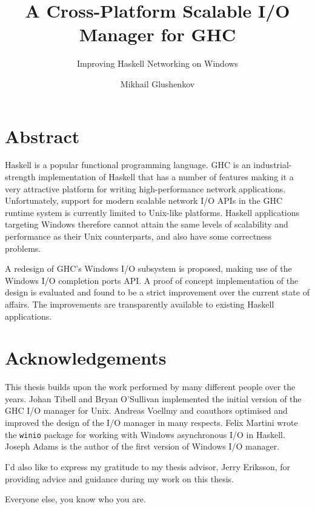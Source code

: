 \documentclass[a4paper,11pt,oneside]{report}
\title{A Cross-Platform Scalable I/O Manager for GHC}
\subtitle{Improving Haskell Networking on Windows}
\author{Mikhail Glushenkov}
\begin{document}
\maketitle

\chapter*{Abstract}

Haskell is a popular functional programming language. GHC is an
industrial-strength implementation of Haskell that has a number of features
making it a very attractive platform for writing high-performance network
applications. Unfortunately, support for modern scalable network I/O APIs in the
GHC runtime system is currently limited to Unix-like platforms. Haskell
applications targeting Windows therefore cannot attain the same levels of
scalability and performance as their Unix counterparts, and also have some
correctness problems.

A redesign of GHC's Windows I/O subsystem is proposed, making use of the Windows
I/O completion ports API. A proof of concept implementation of the design is
evaluated and found to be a strict improvement over the current state of
affairs. The improvements are transparently available to existing Haskell
applications.

\pagebreak

\chapter*{Acknowledgements}

This thesis builds upon the work performed by many different people over the
years. Johan Tibell and Bryan O'Sullivan implemented the initial version of the
GHC I/O manager for Unix. Andreas Voellmy and coauthors optimised and improved
the design of the I/O manager in many respects. Felix Martini wrote the
\texttt{winio} package for working with Windows asynchronous I/O in
Haskell. Joseph Adams is the author of the first version of Windows I/O manager.

I'd also like to express my gratitude to my thesis advisor, Jerry Eriksson, for
providing advice and guidance during my work on this thesis.

Everyone else, you know who you are.

\pagebreak


\tableofcontents

\pagebreak

\pagestyle{fancy}
\setcounter{page}{1}
\setcounter{chapter}{-1}
\end{document}
